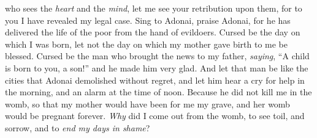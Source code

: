 \begin{biblechapter}
who sees the \textit{heart} and the \textit{mind}, 
let me see your retribution upon them, 
for to you I have revealed my legal case.
\verse Sing to Adonai, praise Adonai, 
for he has delivered the life of the poor from the hand of evildoers.
\verse Cursed be the day on which I was born, 
let not the day on which my mother gave birth to me be blessed.
\verse Cursed be the man who brought the news to my father, 
\textit{saying}, “A child is born to you, a son!” 
and he made him very glad.
\verse And let that man be like the cities 
that Adonai demolished without regret, 
and let him hear a cry for help in the morning, 
and an alarm at the time of noon.
\verse Because he did not kill me in the womb, 
so that my mother would have been for me my grave, 
and her womb would be pregnant forever.
\verse \textit{Why} did I come out from the womb, 
to see toil, and sorrow, and to \textit{end my days in shame}?
\end{biblechapter}

